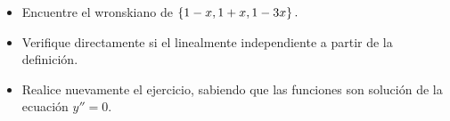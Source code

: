 	\begin{problema}
		\begin{itemize}
			\item  Encuentre el wronskiano de $\left\{ 1-x, 1+x, 1-3x \right\}.$
			
			\item Verifique directamente si el linealmente independiente a partir de  la definición.
			
			\item Realice nuevamente el ejercicio, sabiendo que las funciones son soluci\'on de la ecuaci\'on $y''=0.$
		\end{itemize}
		
	\end{problema}
	




